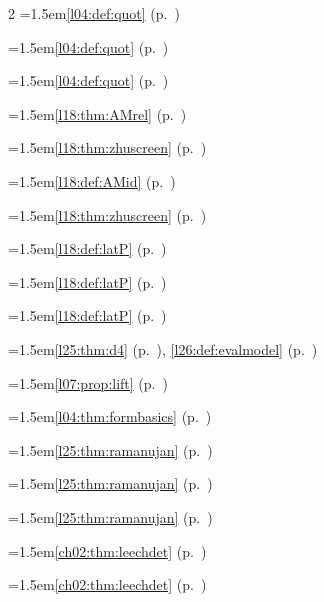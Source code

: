 \begin{multicols}{2}
\hangindent=1.5em\quad \ref{l04:def:quot} (p.~\pageref{l04:def:quot})\par
\hangindent=1.5em\quad \ref{l04:def:quot} (p.~\pageref{l04:def:quot})\par
\hangindent=1.5em\quad \ref{l04:def:quot} (p.~\pageref{l04:def:quot})\par
\hangindent=1.5em\quad \ref{l18:thm:AMrel} (p.~\pageref{l18:thm:AMrel})\par
\hangindent=1.5em\quad \ref{l18:thm:zhuscreen} (p.~\pageref{l18:thm:zhuscreen})\par
\hangindent=1.5em\quad \ref{l18:def:AMid} (p.~\pageref{l18:def:AMid})\par
\hangindent=1.5em\quad \ref{l18:thm:zhuscreen} (p.~\pageref{l18:thm:zhuscreen})\par
\hangindent=1.5em\quad \ref{l18:def:latP} (p.~\pageref{l18:def:latP})\par
\hangindent=1.5em\quad \ref{l18:def:latP} (p.~\pageref{l18:def:latP})\par
\hangindent=1.5em\quad \ref{l18:def:latP} (p.~\pageref{l18:def:latP})\par
\par{}\par\nopagebreak\smallskip
\hangindent=1.5em\quad \ref{l25:thm:d4} (p.~\pageref{l25:thm:d4}), \ref{l26:def:evalmodel} (p.~\pageref{l26:def:evalmodel})\par
\hangindent=1.5em\quad \ref{l07:prop:lift} (p.~\pageref{l07:prop:lift})\par
\hangindent=1.5em\quad \ref{l04:thm:formbasics} (p.~\pageref{l04:thm:formbasics})\par
\hangindent=1.5em\quad \ref{l25:thm:ramanujan} (p.~\pageref{l25:thm:ramanujan})\par
\hangindent=1.5em\quad \ref{l25:thm:ramanujan} (p.~\pageref{l25:thm:ramanujan})\par
\hangindent=1.5em\quad \ref{l25:thm:ramanujan} (p.~\pageref{l25:thm:ramanujan})\par
\hangindent=1.5em\quad \ref{ch02:thm:leechdet} (p.~\pageref{ch02:thm:leechdet})\par
\hangindent=1.5em\quad \ref{ch02:thm:leechdet} (p.~\pageref{ch02:thm:leechdet})\par

\end{multicols}
